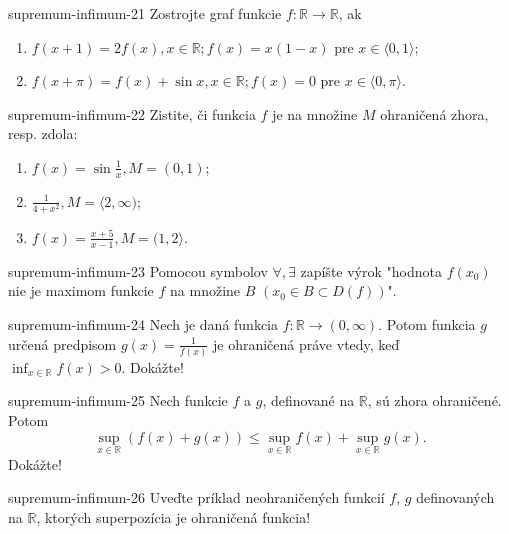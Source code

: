 \begin{defproblem}{supremum-infimum-21}
Zostrojte graf funkcie $f:\mathbb{R}\rightarrow\mathbb{R}$, ak
\begin{enumerate}
\item $f(x+1)=2f(x),x\in\mathbb{R};f(x)=x(1-x)$ pre $x\in\langle 0,1 \rangle$;\\
\item $f(x+\pi)=f(x)+\sin x,x\in\mathbb{R};f(x)=0$ pre $x\in\langle 0,\pi \rangle$.
\end{enumerate}
\end{defproblem}

\begin{defproblem}{supremum-infimum-22}
Zistite, či funkcia $f$ je na množine $M$ ohraničená zhora, resp. zdola:
\begin{enumerate}
\item $f(x)=\sin\frac{1}{x},M=(0,1)$;
\item $\frac{1}{4+x^2},M=\langle 2,\infty )$;
\item $f(x)=\frac{x+5}{x-1},M=(1,2\rangle$.
\end{enumerate}
\end{defproblem}

\begin{defproblem}{supremum-infimum-23}
Pomocou symbolov $\forall,\exists$ zapíšte výrok "hodnota $f(x_0)$ nie je maximom funkcie $f$ na množine $B$ $(x_0\in B\subset D(f))$".
\end{defproblem}

\begin{defproblem}{supremum-infimum-24}
Nech je daná funkcia $f:\mathbb{R}\rightarrow(0,\infty)$. Potom funkcia $g$ určená predpisom $g(x)=\frac{1}{f(x)}$ je ohraničená práve vtedy, keď $\inf_{x\in\mathbb{R}}f(x)>0$. Dokážte!
\end{defproblem}

\begin{defproblem}{supremum-infimum-25}
Nech funkcie $f$ a $g$, definované na $\mathbb{R}$, sú zhora ohraničené. Potom $$\sup_{x\in\mathbb{R}}(f(x)+g(x))\leq\sup_{x\in\mathbb{R}}f(x)+\sup_{x\in\mathbb{R}}g(x).$$ Dokážte!
\end{defproblem}

\begin{defproblem}{supremum-infimum-26}
Uveďte príklad neohraničených funkcií $f$, $g$ definovaných na $\mathbb{R}$, ktorých superpozícia je ohraničená funkcia!
\end{defproblem}

